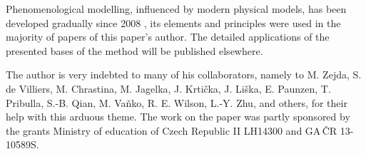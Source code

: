 \documentclass{aa}
\begin{document}
\noindent  Phenomenological modelling, influenced by modern physical models, has been developed gradually since 2008 \citep{mik901}, its elements and principles were used in the majority of papers of this paper's author. The detailed applications of the presented bases of the method will be published elsewhere.




\begin{acknowledgements}
The author is very indebted to many of his collaborators, namely to M. Zejda, S. de Villiers, M. Chrastina, M. Jagelka, J. Krti\v{c}ka, J. Li\v{s}ka, E. Paunzen, T. Pribulla, S.-B. Qian, M. Va\v{n}ko, R. E. Wilson, L.-Y. Zhu, and others, for their help with this arduous theme. The work on the paper was partly sponsored by the grants Ministry of education of Czech Republic II LH14300 and GA\,\v{C}R 13-10589S.
\end{acknowledgements}

%
\end{document}
